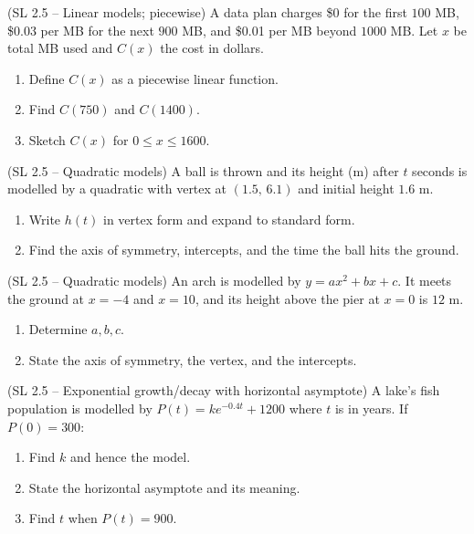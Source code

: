 \documentclass[11pt]{article}
\def\textit#1{#1}%
\newcounter{question}
\begin{document}
\begin{question}
\textit{(SL 2.5 – Linear models; piecewise)}
A data plan charges \$0 for the first $100$ MB, \$0.03 per MB for the next $900$ MB, and \$0.01 per MB beyond $1000$ MB. Let $x$ be total MB used and $C(x)$ the cost in dollars.
\begin{enumerate}
  \item Define $C(x)$ as a piecewise linear function.
  \item Find $C(750)$ and $C(1400)$.
  \item Sketch $C(x)$ for $0\le x \le 1600$.
\end{enumerate}
\end{question}

\begin{question}
\textit{(SL 2.5 – Quadratic models)}
A ball is thrown and its height (m) after $t$ seconds is modelled by a quadratic with vertex at $(1.5,\,6.1)$ and initial height $1.6$ m.
\begin{enumerate}
  \item Write $h(t)$ in vertex form and expand to standard form.
  \item Find the axis of symmetry, intercepts, and the time the ball hits the ground.
\end{enumerate}
\end{question}

\begin{question}
\textit{(SL 2.5 – Quadratic models)}
An arch is modelled by $y=ax^2+bx+c$. It meets the ground at $x=-4$ and $x=10$, and its height above the pier at $x=0$ is $12$ m.
\begin{enumerate}
  \item Determine $a,b,c$.
  \item State the axis of symmetry, the vertex, and the intercepts.
\end{enumerate}
\end{question}

\begin{question}
\textit{(SL 2.5 – Exponential growth/decay with horizontal asymptote)}
A lake’s fish population is modelled by $P(t)=k e^{-0.4t}+1200$ where $t$ is in years. If $P(0)=300$:
\begin{enumerate}
  \item Find $k$ and hence the model.
  \item State the horizontal asymptote and its meaning.
  \item Find $t$ when $P(t)=900$.
\end{enumerate}
\end{question}
\end{document}
